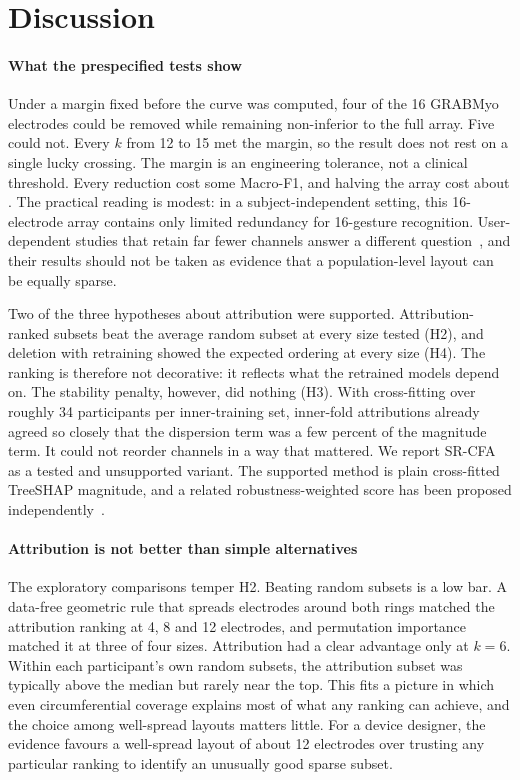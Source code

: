 \section{Discussion}
\label{sec:discussion}

\paragraph{What the prespecified tests show}
Under a margin fixed before the curve was computed, four of the 16 GRABMyo electrodes could be removed while remaining non-inferior to the full array. Five could not. Every $k$ from 12 to 15 met the margin, so the result does not rest on a single lucky crossing. The margin is an engineering tolerance, not a clinical threshold. Every reduction cost some Macro-F1, and halving the array cost about \DeltaKEight. The practical reading is modest: in a subject-independent setting, this 16-electrode array contains only limited redundancy for 16-gesture recognition. User-dependent studies that retain far fewer channels answer a different question~\cite{phinyomark2018emg,qu2021reduce}, and their results should not be taken as evidence that a population-level layout can be equally sparse.

Two of the three hypotheses about attribution were supported. Attribution-ranked subsets beat the average random subset at every size tested (H2), and deletion with retraining showed the expected ordering at every size (H4). The ranking is therefore not decorative: it reflects what the retrained models depend on. The stability penalty, however, did nothing (H3). With cross-fitting over roughly 34 participants per inner-training set, inner-fold attributions already agreed so closely that the dispersion term was a few percent of the magnitude term. It could not reorder channels in a way that mattered. We report SR-CFA as a tested and unsupported variant. The supported method is plain cross-fitted TreeSHAP magnitude, and a related robustness-weighted score has been proposed independently~\cite{xiang2026roshap}.

\paragraph{Attribution is not better than simple alternatives}
The exploratory comparisons temper H2. Beating random subsets is a low bar. A data-free geometric rule that spreads electrodes around both rings matched the attribution ranking at 4, 8 and 12 electrodes, and permutation importance matched it at three of four sizes. Attribution had a clear advantage only at $k = 6$. Within each participant's own random subsets, the attribution subset was typically above the median but rarely near the top. This fits a picture in which even circumferential coverage explains most of what any ranking can achieve, and the choice among well-spread layouts matters little. For a device designer, the evidence favours a well-spread layout of about 12 electrodes over trusting any particular ranking to identify an unusually good sparse subset.

